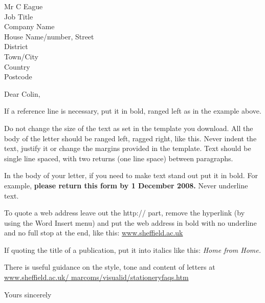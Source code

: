 \documentclass[a4paper]{tuos-letter}
\begin{document}

\begin{letter}{
    Mr C Eague\\
    Job Title\\
    Company Name\\
    House Name/number, Street\\
    District\\
    Town/City\\
    Country\\
    Postcode
  }

  \opening{Dear Colin,}
  If a reference line is necessary, put it in bold, ranged left as in
  the example above.

  Do not change the size of the text as set in the template you
  download. All the body of the letter should be ranged left, ragged
  right, like this. Never indent the text, justify it or change the
  margins provided in the template. Text should be single line spaced,
  with two returns (one line space) between paragraphs.

  In the body of your letter, if you need to make text stand out put
  it in bold. For example, \textbf{please return this form by 1
    December 2008.} Never underline text.

  To quote a web address leave out the http:// part, remove the
  hyperlink (by using the Word Insert menu) and put the web address in
  bold with no underline and no full stop at the end, like this:
  \url{www.sheffield.ac.uk}

  If quoting the title of a publication, put it into italics like
  this: \textit{Home from Home.}

  There is useful guidance on the style, tone and content of letters
  at \url{www.sheffield.ac.uk/ marcoms/visualid/stationeryfaqs.htm}

  \closing{Yours sincerely}
\end{letter}
\end{document}
